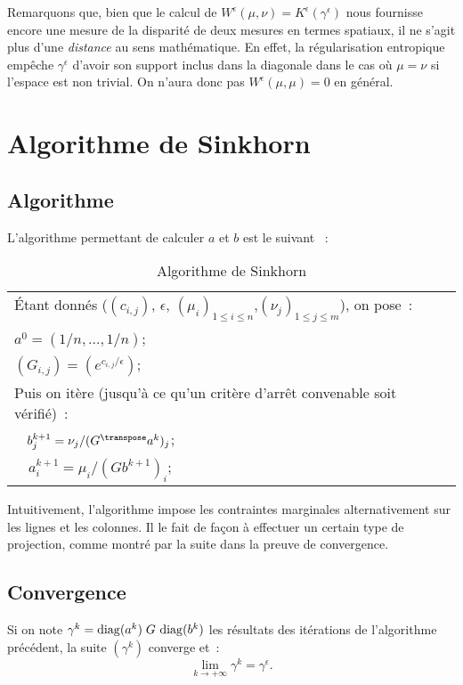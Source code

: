 Remarquons que, bien que le calcul de $W^\epsilon(\mu,\nu) = K^\epsilon(\gamma^\epsilon)$ nous fournisse encore une mesure de la disparité de deux mesures en termes spatiaux, il ne s'agit plus d'une \emph{distance} au sens mathématique. En effet, la régularisation entropique empêche $\gamma^\epsilon$ d'avoir son support inclus dans la diagonale dans le cas où $\mu = \nu$ si l'espace est non trivial. On n'aura donc pas $W^\epsilon (\mu,\mu) = 0$ en général.

\section{Algorithme de Sinkhorn}

\subsection{Algorithme}
L'algorithme permettant de calculer $a$ et $b$ est le suivant \cite{cuturi13}~:

\begin{table}[h!]
\centering
\caption*{Algorithme de Sinkhorn}
\label{algorithme}
\begin{tabular}{|l|}
\hline
\'Etant donnés ($(c_{i,j})$, $\epsilon$, $(\mu_i)_{1\le i \le n}$,$(\nu_j)_{1 \le j \le m}$), on pose~: \\
$a^0 = (1/n, \ldots, 1/n)$;\\
$(G_{i,j}) = (e^{c_{i,j}/\epsilon})$;\\
Puis on itère (jusqu'à ce qu'un critère d'arrêt convenable soit vérifié)~: \\
$\quad b^{k+1}_j = \nu_j / (G^\transpose a^k)_j$;\\
$\quad a^{k+1}_i = \mu_i /(G b^{k+1})_i$; \\
\hline
\end{tabular}
\end{table}
Intuitivement, l'algorithme impose les contraintes marginales alternativement sur les lignes et les colonnes. Il le fait de façon à effectuer un certain type de projection, comme montré par la suite dans la preuve de convergence.

\subsection{Convergence}
\begin{theoreme}
\label{th:sink_cv}
Si on note $\gamma^k = \operatorname{diag}(a^k)\;G\,\operatorname{diag}(b^k)$ les résultats des itérations de l'algorithme précédent, la suite $(\gamma^k)$ converge et~:
\[\lim_{k \rightarrow +\infty} \gamma^k = \gamma^\epsilon .\]
\end{theoreme}

